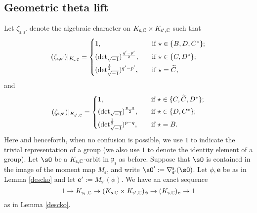 \documentclass[12pt,a4paper]{amsart}
\newcommand{\p}{\mathfrak p}
\numberwithin{equation}{section}
\theoremstyle{remark}
\begin{document}
\subsection{Geometric theta lift}
Let $\zeta_{\mathsf s, \mathsf s'}$ denote the algebraic character on $K_{\mathsf s, \mathbb{C}}\times K_{\mathsf s', \mathbb{C}}$  such that
\[
 (\zeta_{\mathsf s, \mathsf s'})|_{K_{\mathsf s, \C}}=
   \begin{cases}
    1, \quad & \textrm{if $\star\in \{B, D, C^*\}$}; \smallskip\\
      ({\det}_{\sqrt{-1}})^{\frac{q'-p'}{2}}, \quad & \textrm{if $\star\in \{C, D^*\}$};\smallskip\\
     ({\det}_{\sqrt{-1}}^{\frac{1}{2}})^{q'-p'}, \quad & \textrm{if $\star=\widetilde C$,}\\
  \end{cases}
\]
and
\[
 (\zeta_{\mathsf s, \mathsf s'})|_{K_{\mathsf s', \C}}=
   \begin{cases}
    1, \quad & \textrm{if $\star\in \{C, \widetilde C, D^*\}$}; \smallskip\\
      ({\det}_{\sqrt{-1}})^{\frac{p-q}{2}}, \quad & \textrm{if $\star\in \{D, C^*\}$};\smallskip\\
     ({\det}_{\sqrt{-1}}^{\frac{1}{2}})^{p-q}, \quad & \textrm{if $\star=B$}.
 \end{cases}
\]
Here and henceforth, when no confusion is possible, we  use $1$ to indicate the trivial representation of a group (we also use $1$ to denote the identity element of a group).
Let  $\sO$ be a $K_{\mathsf s, \mathbb{C}}$-orbit in $\p_{\mathsf s}$ as before. Suppose that $\sO$ is contained in the image of the moment map $M_{\mathsf s}$, and write $\sO':=\nabla^{\mathsf s}_{\mathsf s'}(\sO)$.
Let $\phi,\mathbf e$ be as in Lemma  \ref{descko} and let $\mathbf e':=M_{\mathsf s'}(\phi)$. We have an exact sequence
\[
  1\rightarrow K_{\mathsf s_1,\mathbb{C}}\rightarrow (K_{\mathsf s,\mathbb{C}}\times K_{\mathsf s', \mathbb{C}})_\phi\rightarrow (K_{\mathsf s,\mathbb{C}})_{\mathbf e}\rightarrow 1
\]
as in Lemma  \ref{descko}.
\end{document}
